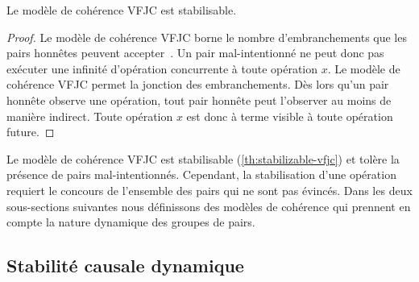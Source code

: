 

\begin{theorem}\label{th:stabilizable-vfjc}
Le modèle de cohérence \ac{VFJC} est stabilisable.
\end{theorem}

\begin{proof}
Le modèle de cohérence \ac{VFJC} borne le nombre d'embranchements que les pairs honnêtes peuvent accepter~\autocite{mahajan_2011_cac}.
Un pair mal-intentionné ne peut donc pas exécuter une infinité d'opération concurrente à toute opération $x$.
Le modèle de cohérence \ac{VFJC} permet la jonction des embranchements.
Dès lors qu'un pair honnête observe une opération, tout pair honnête peut l'observer au moins de manière indirect.
Toute opération $x$ est donc à terme visible à toute opération future.
\end{proof}

Le modèle de cohérence \ac{VFJC} est stabilisable (\autoref{th:stabilizable-vfjc}) et tolère la présence de pairs mal-intentionnés.
Cependant, la stabilisation d'une opération requiert le concours de l'ensemble des pairs qui ne sont pas évincés.
Dans les deux sous-sections suivantes nous définissons des modèles de cohérence qui prennent en compte la nature dynamique des groupes de pairs.

\clearpage

\subsection{Stabilité causale dynamique}\label{subsec:dcs}

